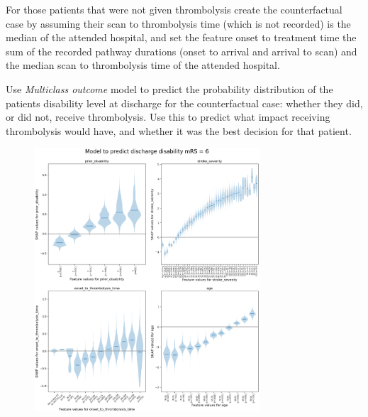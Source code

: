 For those patients that were not given thrombolysis create the counterfactual case by assuming their scan to thrombolysis time (which is not recorded) is the median of the attended hospital, and set the feature onset to treatment time the sum of the recorded pathway durations (onset to arrival and arrival to scan) and the median scan to thrombolysis time of the attended hospital.

Use \textit{Multiclass outcome} model to predict the probability distribution of the patients disability level at discharge for the counterfactual case: whether they did, or did not, receive thrombolysis. Use this to predict what impact receiving thrombolysis would have, and whether it was the best decision for that patient.





\begin{figure}[!h]
    \centering    
    \includegraphics[width=0.75\textwidth]
    {./images/043_outcome_mrs6_violin_plots.png}\\
    \caption{}
    \label{fig:mrs6_violin}
\end{figure}

